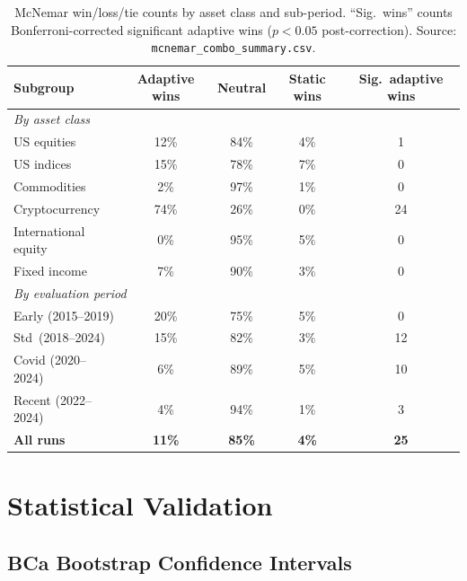 \begin{appendices}
\begin{table}[htbp]
  \centering
  \caption{McNemar win/loss/tie counts by asset class and sub-period.
    ``Sig.\ wins'' counts Bonferroni-corrected significant adaptive wins ($p < 0.05$
    post-correction).  Source: \texttt{mcnemar\_combo\_summary.csv}.}
  \label{tab:mcnemar_summary}
  \begin{tabular}{lcccc}
    \hline
    \textbf{Subgroup} & \textbf{Adaptive wins} & \textbf{Neutral}
      & \textbf{Static wins} & \textbf{Sig.\ adaptive wins} \\
    \hline
    \multicolumn{5}{l}{\textit{By asset class}} \\
    US equities          & 12\% & 84\% &  4\% &  1 \\
    US indices           & 15\% & 78\% &  7\% &  0 \\
    Commodities          &  2\% & 97\% &  1\% &  0 \\
    Cryptocurrency       & 74\% & 26\% &  0\% & 24 \\
    International equity &  0\% & 95\% &  5\% &  0 \\
    Fixed income         &  7\% & 90\% &  3\% &  0 \\
    \hline
    \multicolumn{5}{l}{\textit{By evaluation period}} \\
    Early (2015--2019)   & 20\% & 75\% &  5\% &  0 \\
    Std\ (2018--2024)    & 15\% & 82\% &  3\% & 12 \\
    Covid (2020--2024)   &  6\% & 89\% &  5\% & 10 \\
    Recent (2022--2024)  &  4\% & 94\% &  1\% &  3 \\
    \hline
    \textbf{All runs}    & \textbf{11\%} & \textbf{85\%} & \textbf{4\%}
      & \textbf{25} \\
    \hline
  \end{tabular}
\end{table}

\section{Statistical Validation}

\subsection{BCa Bootstrap Confidence Intervals}


\end{appendices}
